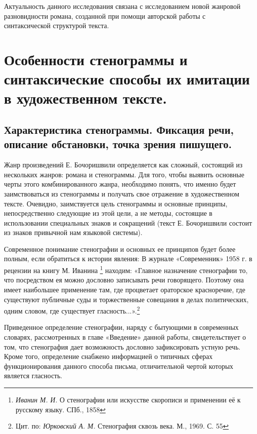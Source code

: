 \documentclass{kursa4}
\begin{document}
    Актуальность данного исследования связана с исследованием новой жанровой разновидности романа, созданной при помощи авторской работы с синтаксической структурой текста. 

  \setcounter{chapter}{0}
  \chapter {Особенности стенограммы и синтаксические способы их имитации в художественном тексте.}

    \section {Характеристика стенограммы. Фиксация речи, описание обстановки, точка зрения пишущего.}

      Жанр произведений Е. Бочоришвили определяется как сложный, состоящий из нескольких жанров: романа и стенограммы. Для того, чтобы выявить основные черты этого комбинированного жанра, необходимо понять, что именно будет заимствоваться из стенограммы и получать свое отражение в художественном тексте. Очевидно, заимствуется цель стенограммы и основные принципы, непосредственно следующие из этой цели, а не методы, состоящие в использовании специальных знаков и сокращений (текст Е. Бочоришвили состоит из знаков привычной нам языковой системы). 

      Современное понимание стенографии и основных ее принципов будет более полным, если обратиться к истории явления: В журнале «Современник» 1958 г. в рецензии на книгу М. Иванина \footnote{\textit{Иванин М. И. }О стенографии или искусстве скорописи и применении её к русскому языку. СПб., 1858} находим: «Главное назначение стенографии то, что посредством ея можно дословно записывать речи говорящего. Поэтому она имеет наибольшее применение там, где процветает ораторское красноречие, где существуют публичные суды и торжественные совещания в делах политических, одним словом, где существует гласность...».\footnote{{ Цит. по: }\textit{{Юрковский А. М.
      }}{Стенография сквозь века. М., 1969. С. 55}}{ }

       Приведенное определение стенографии, наряду с бытующими в современных словарях, рассмотренных в главе «Введение» данной работы, свидетельствует о том, что стенография дает возможность дословно зафиксировать устную речь. Кроме того, определение снабжено информацией о типичных сферах функционирования данного способа письма, отличительной чертой которых является гласность. 
\end{document}

